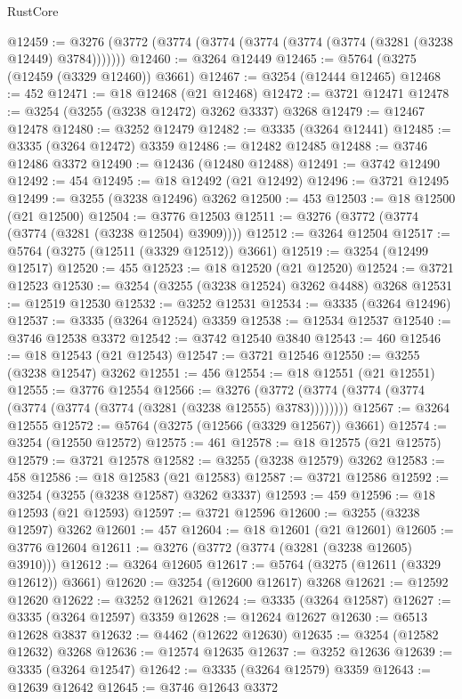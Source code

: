 \begin{lexlean}{RustCore}
\begin{coremodule}
@12459 := @3276 (@3772 (@3774 (@3774 (@3774 (@3774 (@3774 (@3281 (@3238 @12449) @3784)))))))
@12460 := @3264 @12449
@12465 := @5764 (@3275 (@12459 (@3329 @12460)) @3661)
@12467 := @3254 (@12444 @12465)
@12468 := 452
@12471 := @18 @12468 (@21 @12468)
@12472 := @3721 @12471
@12478 := @3254 (@3255 (@3238 @12472) @3262 @3337) @3268
@12479 := @12467 @12478
@12480 := @3252 @12479
@12482 := @3335 (@3264 @12441)
@12485 := @3335 (@3264 @12472) @3359
@12486 := @12482 @12485
@12488 := @3746 @12486 @3372
@12490 := @12436 (@12480 @12488)
@12491 := @3742 @12490
@12492 := 454
@12495 := @18 @12492 (@21 @12492)
@12496 := @3721 @12495
@12499 := @3255 (@3238 @12496) @3262
@12500 := 453
@12503 := @18 @12500 (@21 @12500)
@12504 := @3776 @12503
@12511 := @3276 (@3772 (@3774 (@3774 (@3281 (@3238 @12504) @3909))))
@12512 := @3264 @12504
@12517 := @5764 (@3275 (@12511 (@3329 @12512)) @3661)
@12519 := @3254 (@12499 @12517)
@12520 := 455
@12523 := @18 @12520 (@21 @12520)
@12524 := @3721 @12523
@12530 := @3254 (@3255 (@3238 @12524) @3262 @4488) @3268
@12531 := @12519 @12530
@12532 := @3252 @12531
@12534 := @3335 (@3264 @12496)
@12537 := @3335 (@3264 @12524) @3359
@12538 := @12534 @12537
@12540 := @3746 @12538 @3372
@12542 := @3742 @12540 @3840
@12543 := 460
@12546 := @18 @12543 (@21 @12543)
@12547 := @3721 @12546
@12550 := @3255 (@3238 @12547) @3262
@12551 := 456
@12554 := @18 @12551 (@21 @12551)
@12555 := @3776 @12554
@12566 := @3276 (@3772 (@3774 (@3774 (@3774 (@3774 (@3774 (@3774 (@3281 (@3238 @12555) @3783))))))))
@12567 := @3264 @12555
@12572 := @5764 (@3275 (@12566 (@3329 @12567)) @3661)
@12574 := @3254 (@12550 @12572)
@12575 := 461
@12578 := @18 @12575 (@21 @12575)
@12579 := @3721 @12578
@12582 := @3255 (@3238 @12579) @3262
@12583 := 458
@12586 := @18 @12583 (@21 @12583)
@12587 := @3721 @12586
@12592 := @3254 (@3255 (@3238 @12587) @3262 @3337)
@12593 := 459
@12596 := @18 @12593 (@21 @12593)
@12597 := @3721 @12596
@12600 := @3255 (@3238 @12597) @3262
@12601 := 457
@12604 := @18 @12601 (@21 @12601)
@12605 := @3776 @12604
@12611 := @3276 (@3772 (@3774 (@3281 (@3238 @12605) @3910)))
@12612 := @3264 @12605
@12617 := @5764 (@3275 (@12611 (@3329 @12612)) @3661)
@12620 := @3254 (@12600 @12617) @3268
@12621 := @12592 @12620
@12622 := @3252 @12621
@12624 := @3335 (@3264 @12587)
@12627 := @3335 (@3264 @12597) @3359
@12628 := @12624 @12627
@12630 := @6513 @12628 @3837
@12632 := @4462 (@12622 @12630)
@12635 := @3254 (@12582 @12632) @3268
@12636 := @12574 @12635
@12637 := @3252 @12636
@12639 := @3335 (@3264 @12547)
@12642 := @3335 (@3264 @12579) @3359
@12643 := @12639 @12642
@12645 := @3746 @12643 @3372

\end{coremodule}
\end{lexlean}
